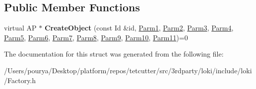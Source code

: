 \subsection*{Public Member Functions}
\begin{DoxyCompactItemize}
\item 
\hypertarget{structLoki_1_1FactoryImpl_3_01AP_00_01Id_00_01LOKI__TYPELIST__11_07P1_00_01P2_00_01P3_00_01P4_0057b58833803e40340e0ecec150a877a5_a54ec0d12d195a3de27aca2870645b2ff}{}virtual A\+P $\ast$ {\bfseries Create\+Object} (const Id \&id, \hyperlink{classLoki_1_1EmptyType}{Parm1}, \hyperlink{classLoki_1_1EmptyType}{Parm2}, \hyperlink{classLoki_1_1EmptyType}{Parm3}, \hyperlink{classLoki_1_1EmptyType}{Parm4}, \hyperlink{classLoki_1_1EmptyType}{Parm5}, \hyperlink{classLoki_1_1EmptyType}{Parm6}, \hyperlink{classLoki_1_1EmptyType}{Parm7}, \hyperlink{classLoki_1_1EmptyType}{Parm8}, \hyperlink{classLoki_1_1EmptyType}{Parm9}, \hyperlink{classLoki_1_1EmptyType}{Parm10}, \hyperlink{classLoki_1_1EmptyType}{Parm11})=0\label{structLoki_1_1FactoryImpl_3_01AP_00_01Id_00_01LOKI__TYPELIST__11_07P1_00_01P2_00_01P3_00_01P4_0057b58833803e40340e0ecec150a877a5_a54ec0d12d195a3de27aca2870645b2ff}

\end{DoxyCompactItemize}


The documentation for this struct was generated from the following file\+:\begin{DoxyCompactItemize}
\item 
/\+Users/pourya/\+Desktop/platform/repos/tetcutter/src/3rdparty/loki/include/loki/Factory.\+h\end{DoxyCompactItemize}
